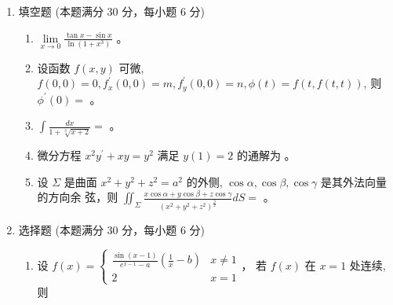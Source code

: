 

\begin{enumerate}
	\item
填空题 (本题满分 30 分，每小题 6 分)
\begin{enumerate}
	\item
$\lim\limits _{x \rightarrow 0} \frac{\tan x-\sin x}{\ln \left(1+x^{3}\right)}$  。


\item
设函数 $f(x, y)$ 可微, $f(0,0)=0, f_{x}^{\prime}(0,0)=m, f_{y}^{\prime}(0,0)=n, \phi(t)=f(t, f(t, t))$, 则 $\phi^{\prime}(0)=$  。


\item
    $\int \frac{d x}{1+\sqrt[3]{x+2}}=$  。


\item
微分方程 $x^{2} y^{\prime}+x y=y^{2}$ 满足 $y(1)=2$ 的通解为  。



\item
    设 $\Sigma$ 是曲面 $x^{2}+y^{2}+z^{2}=a^{2}$ 的外侧, $\cos \alpha, \cos \beta, \cos \gamma$ 是其外法向量的方向余 弦，则 $\iint_{\Sigma} \frac{x \cos \alpha+y \cos \beta+z \cos \gamma}{\left(x^{2}+y^{2}+z^{2}\right)^{\frac{3}{2}}} d S=$ \tk{$ 4\pi $} 。

\end{enumerate}

\item 
选择题 (本题满分 30 分，每小题 6 分)
\begin{enumerate}
	\item
设 $f(x)=\left\{\begin{array}{ll}\frac{\sin (x-1)}{e^{x-1} - a}\left(\frac{1}{x}-b\right) & x \neq 1 \\ 2 & x=1\end{array}\right.$， 若 $f(x)$ 在 $x=1$ 处连续, 则  


\end{enumerate}
\end{enumerate}
